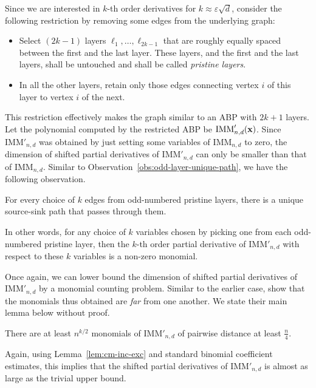 \documentclass[12pt]{report}
\renewcommand{\epsilon}{\varepsilon}
\begin{document}
Since we are interested in $k$-th order derivatives for $k \approx \epsilon \sqrt{d}$, \cite{FLMS13} consider the following restriction by removing some edges from the underlying graph:
\begin{itemize}
\item Select $(2k-1)$ layers $\ell_1,\dots, \ell_{2k-1}$ that are roughly equally spaced between the first and the last layer. These layers, and the first and the last layers, shall be untouched and shall be called \emph{pristine layers}.
\item In all the other layers, retain only those edges connecting vertex $i$ of this layer to vertex $i$  of the next. 
\end{itemize}
This restriction effectively makes the graph similar to an ABP with $2k+1$ layers. Let the polynomial computed by the restricted ABP be $\mathrm{IMM}'_{n,d}(\mathbf{x})$. Since $\mathrm{IMM}'_{n,d}$ was obtained by just setting some variables of $\mathrm{IMM}_{n,d}$ to zero, the dimension of shifted partial derivatives of $\mathrm{IMM}'_{n,d}$ can only be smaller than that of $\mathrm{IMM}_{n,d}$. Similar to Observation~\ref{obs:odd-layer-unique-path}, we have the following observation. 

\begin{observation}
For every choice of $k$ edges from odd-numbered pristine layers, there is a unique source-sink path that passes through them. 

In other words, for any choice of $k$ variables chosen by picking one from each odd-numbered pristine layer, then the $k$-th order partial derivative of $\mathrm{IMM}'_{n,d}$ with respect to these $k$ variables is a non-zero monomial. 
\end{observation}

Once again, we can lower bound the dimension of shifted partial derivatives of $\mathrm{IMM}'_{n,d}$ by a monomial counting problem. Similar to the earlier case, \cite{FLMS13} show that the monomials thus obtained are \emph{far} from one another. We state their main lemma below without proof. 

\begin{lemma}
There are at least $n^{k/2}$ monomials of $\mathrm{IMM}'_{n,d}$ of pairwise distance at least $\frac{n}{4}$. 
\end{lemma}

Again, using Lemma~\ref{lem:cm-inc-exc} and standard binomial coefficient estimates, this implies that the shifted partial derivatives of $\mathrm{IMM}'_{n,d}$ is almost as large as the trivial upper bound. 
\end{document}
